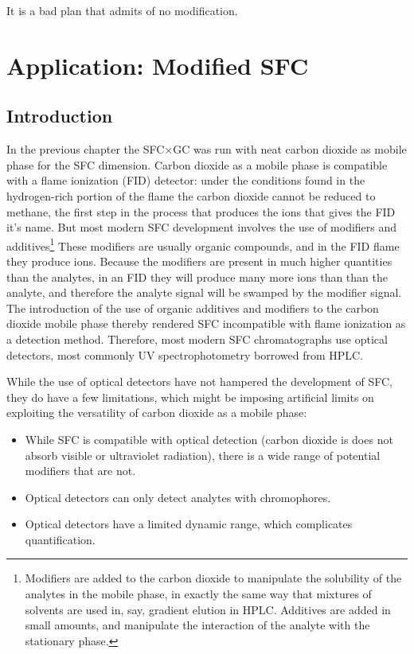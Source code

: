 
\begin{savequote}[45mm]
It is a bad plan that admits of no modification.
\end{savequote}

\chapter{Application: Modified SFC} %

\label{Chapter7} %

\section{Introduction}

In the previous chapter the SFC×GC was run with neat carbon dioxide as mobile
phase for the SFC dimension. Carbon dioxide as a mobile phase is compatible with
a flame ionization (FID) detector: under the conditions found in the
hydrogen-rich portion of the flame the carbon dioxide cannot be reduced to
methane, the first step in the process that produces the ions that gives the FID
it's name. But most modern SFC development involves the use of modifiers and
additives\footnote{Modifiers are added to the carbon dioxide to manipulate the
solubility of the analytes in the mobile phase, in exactly the same way that
mixtures of solvents are used in, say, gradient elution in HPLC. Additives are
added in small amounts, and manipulate the interaction of the analyte with the
stationary phase.} These modifiers are usually organic compounds, and in the FID
flame they produce ions. Because the modifiers are present in much higher
quantities than the analytes, in an FID they will produce many more ions than
than the analyte, and therefore the analyte signal will be swamped by the
modifier signal. The introduction of the use of organic additives and modifiers
to the carbon dioxide mobile phase thereby rendered SFC incompatible
with flame ionization as a detection method. Therefore, most modern SFC
chromatographs use optical detectors, most commonly UV spectrophotometry
borrowed from HPLC.

While the use of optical detectors have not hampered the development of SFC,
they do have a few limitations, which might be imposing artificial limits on
exploiting the versatility of carbon dioxide as a mobile phase:

\begin{itemize}

\item While SFC is compatible with optical detection (carbon dioxide is does not
absorb visible or ultraviolet radiation), there is a wide range of potential
modifiers that are not.

\item Optical detectors can only detect analytes with chromophores.

\item Optical detectors have a limited dynamic range, which complicates quantification. 

\end{itemize}

